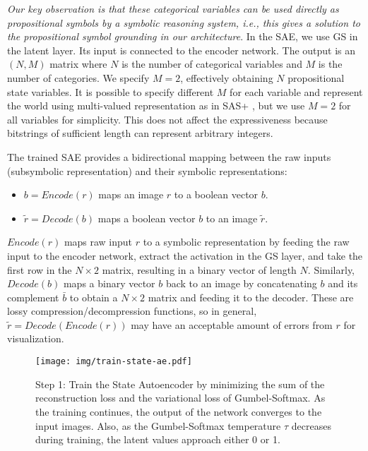 \documentclass[11pt]{article}
\begin{document}
{\it Our key observation is that these categorical variables can be used directly as propositional symbols by a symbolic reasoning system, i.e., this gives a solution to the propositional symbol grounding in our architecture}.
In the SAE, we use GS in the latent layer. Its input is connected to the encoder network. The output is an $(N, M)$ matrix where $N$ is the number of categorical variables and $M$ is the number of categories.
We specify $M=2$, effectively obtaining $N$ propositional state variables. It is possible to specify different $M$ for each variable and represent the world using multi-valued representation as in SAS+ \cite{backstrom1995complexity}, but we use $M=2$ for all variables for simplicity.
This does not affect the expressiveness because bitstrings of sufficient length can represent arbitrary integers.

The trained SAE provides a bidirectional mapping between the raw inputs (subsymbolic representation) and their symbolic representations:
\begin{itemize} %
\setlength{\itemsep}{-0.3em}
\item $b=Encode(r)$ maps an image  $r$ to a boolean vector $b$.
\item $\tilde{r}=Decode(b)$ maps a boolean vector $b$ to an image $\tilde{r}$.
\end{itemize}
$Encode(r)$ maps raw input $r$ to a symbolic representation by feeding the raw input to the encoder network, extract the activation in the GS layer,
 and take the first row in the $N \times 2$ matrix, resulting in a binary vector of length $N$. Similarly, $Decode(b)$ maps a binary vector $b$  back to an image by concatenating $b$ and its complement $\bar{b}$ to obtain a $N \times 2$ matrix and feeding it to the decoder.
These are lossy compression/decompression functions, so in general, $\tilde{r}=Decode(Encode(r))$ may have an acceptable amount of errors from $r$ for visualization.

\begin{figure}[tbp]
 \centering
 \texttt{[image: img/train-state-ae.pdf]}
 \caption{Step 1:
Train the State Autoencoder by
 minimizing the sum of the reconstruction loss and the variational loss of Gumbel-Softmax.
As the training continues, the output of the network converges to the input images.
Also, as the Gumbel-Softmax temperature $\tau$ decreases during training,
the latent values approach either 0 or 1.}
\label{fig:sae}
\end{figure}
\end{document}
